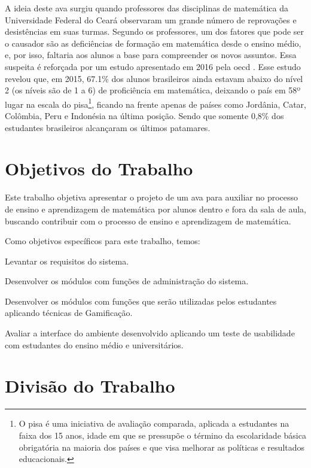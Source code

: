 A ideia deste \gls{ava} surgiu quando professores das disciplinas de matemática da Universidade Federal do Cear\'a observaram um grande número de 
reprovações e desistências em suas turmas. Segundo os professores, um dos fatores que pode ser o causador são as deficiências de formação em 
matemática desde o ensino médio, e, por isso, faltaria aos alunos a base para compreender os novos assuntos. Essa suspeita é reforçada por um estudo apresentado em 2016 pela \gls{oecd} \cite{pisainfocus2016}. Esse estudo revelou que, em 2015, 67.1\% dos alunos brasileiros ainda estavam abaixo do nível 2 (os níveis são de 1 a 6) de proficiência em matem\'atica, deixando o país em 58º lugar na escala do \gls{pisa}\footnote{O \gls{pisa} é uma iniciativa de avaliação comparada, aplicada a estudantes na faixa dos 15 
anos, idade em que se pressupõe o término da escolaridade básica obrigatória na maioria dos países e que visa melhorar as políticas e 
resultados educacionais.}, ficando na frente apenas de países como Jordânia, Catar, Colômbia, Peru e Indonésia na \'ultima posi\c{c}\~ao. 
Sendo que somente 0,8\% dos estudantes brasileiros alcançaram os últimos patamares.

\section{Objetivos do Trabalho}

Este trabalho objetiva apresentar o projeto de um \acrshort{ava} para auxiliar no processo de ensino e aprendizagem de matemática por alunos dentro e 
fora da sala de aula, buscando contribuir com o processo de ensino e aprendizagem de matem\'atica. 

Como objetivos específicos para este trabalho, temos: 
\begin{alineas}
  \item Levantar os requisitos do sistema.
  \item Desenvolver os módulos com funções de administração do sistema.
  \item Desenvolver os módulos com funções que serão utilizadas pelos estudantes aplicando técnicas de Gamificação.
  \item Avaliar a interface do ambiente desenvolvido aplicando um teste de usabilidade com estudantes do ensino m\'edio e universit\'arios.
\end{alineas}


\section{Divisão do Trabalho}

